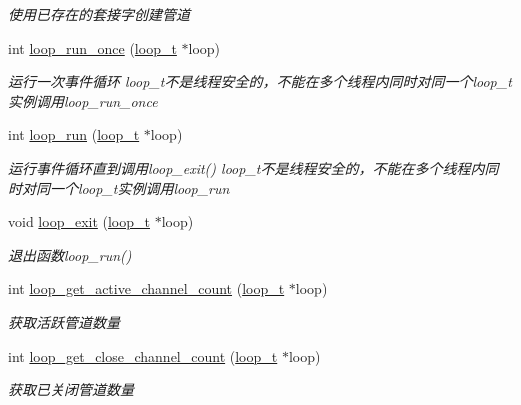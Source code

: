 \begin{DoxyCompactItemize}
\begin{DoxyCompactList}\small\item\em 使用已存在的套接字创建管道 \end{DoxyCompactList}\item 
int \hyperlink{a00085_ga2f1994d76e46cf4855ac955ccd41d9ef_ga2f1994d76e46cf4855ac955ccd41d9ef}{loop\+\_\+run\+\_\+once} (\hyperlink{a00044_a9c3ad1cd2de83e09f3a7b59fa82c94ee_a9c3ad1cd2de83e09f3a7b59fa82c94ee}{loop\+\_\+t} $\ast$loop)
\begin{DoxyCompactList}\small\item\em 运行一次事件循环 loop\+\_\+t不是线程安全的，不能在多个线程内同时对同一个loop\+\_\+t实例调用loop\+\_\+run\+\_\+once \end{DoxyCompactList}\item 
int \hyperlink{a00085_ga8eb0f6c8d398c70fc5ca2292664a1187_ga8eb0f6c8d398c70fc5ca2292664a1187}{loop\+\_\+run} (\hyperlink{a00044_a9c3ad1cd2de83e09f3a7b59fa82c94ee_a9c3ad1cd2de83e09f3a7b59fa82c94ee}{loop\+\_\+t} $\ast$loop)
\begin{DoxyCompactList}\small\item\em 运行事件循环直到调用loop\+\_\+exit() loop\+\_\+t不是线程安全的，不能在多个线程内同时对同一个loop\+\_\+t实例调用loop\+\_\+run \end{DoxyCompactList}\item 
void \hyperlink{a00085_ga898c7e8ef4ff2f360a32454b2b1013de_ga898c7e8ef4ff2f360a32454b2b1013de}{loop\+\_\+exit} (\hyperlink{a00044_a9c3ad1cd2de83e09f3a7b59fa82c94ee_a9c3ad1cd2de83e09f3a7b59fa82c94ee}{loop\+\_\+t} $\ast$loop)
\begin{DoxyCompactList}\small\item\em 退出函数loop\+\_\+run() \end{DoxyCompactList}\item 
int \hyperlink{a00085_ga6fa8f99fdc7a036fea6ca91971885e52_ga6fa8f99fdc7a036fea6ca91971885e52}{loop\+\_\+get\+\_\+active\+\_\+channel\+\_\+count} (\hyperlink{a00044_a9c3ad1cd2de83e09f3a7b59fa82c94ee_a9c3ad1cd2de83e09f3a7b59fa82c94ee}{loop\+\_\+t} $\ast$loop)
\begin{DoxyCompactList}\small\item\em 获取活跃管道数量 \end{DoxyCompactList}\item 
int \hyperlink{a00085_ga604184ddcd3e06bc7bfd4f1722778029_ga604184ddcd3e06bc7bfd4f1722778029}{loop\+\_\+get\+\_\+close\+\_\+channel\+\_\+count} (\hyperlink{a00044_a9c3ad1cd2de83e09f3a7b59fa82c94ee_a9c3ad1cd2de83e09f3a7b59fa82c94ee}{loop\+\_\+t} $\ast$loop)
\begin{DoxyCompactList}\small\item\em 获取已关闭管道数量 \end{DoxyCompactList}\end{DoxyCompactItemize}


